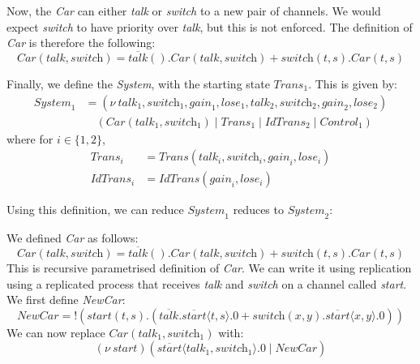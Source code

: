\documentclass[a4paper, openany]{memoir}
\theoremstyle{definition}
\begin{document}
    Now, the \textit{Car} can either \textit{talk} or \textit{switch} to a new pair of channels. We would expect \textit{switch} to have priority over \textit{talk}, but this is not enforced. The definition of \textit{Car} is therefore the following:
    \[\textit{Car}(\textit{talk}, \textit{switch}) = \overline{\textit{talk}}().\textit{Car} (\textit{talk}, \textit{switch}) + \textit{switch} (t, s).\textit{Car}(t, s)\]

    Finally, we define the \textit{System}, with the starting state $\textit{Trans}_1$. This is given by:
    \begin{align*}
        \textit{System}_1 &= (\nu \ \textit{talk}_1, \textit{switch}_1, \textit{gain}_1, \textit{lose}_1, \textit{talk}_2, \textit{switch}_2, \textit{gain}_2, \textit{lose}_2) \\
        &\quad (\textit{Car}(\textit{talk}_1, \textit{switch}_1) \mid \textit{Trans}_1 \mid \textit{IdTrans}_2 \mid \textit{Control}_1)
    \end{align*}
    where for $i \in \{1, 2\}$,
    \begin{align*}
        \textit{Trans}_i &= \textit{Trans}(\textit{talk}_i, \textit{switch}_i, \textit{gain}_i, \textit{lose}_i) \\
        \textit{IdTrans}_i &= \textit{IdTrans}(\textit{gain}_i, \textit{lose}_i) 
    \end{align*}

    Using this definition, we can reduce $\textit{System}_1$ reduces to $\textit{System}_2$:


    We defined \textit{Car} as follows:
    \[\textit{Car}(\textit{talk}, \textit{switch}) = \overline{\textit{talk}}().\textit{Car} (\textit{talk}, \textit{switch}) + \textit{switch} (t, s).\textit{Car}(t, s)\]
    This is recursive parametrised definition of \textit{Car}. We can write it using replication using a replicated process that receives \textit{talk} and \textit{switch} on a channel called \textit{start}. We first define \textit{NewCar}:
    \[\textit{NewCar} = !(\textit{start}(t, s).(
        \overline{\textit{talk}}.\overline{\textit{start}}\langle t, s \rangle.0 + 
        \textit{switch}(x, y).\overline{start} \langle x, y \rangle.0
    ))\]
    We can now replace $\textit{Car}(\textit{talk}_1, \textit{switch}_1)$ with:
    \[(\nu \ \textit{start})(\overline{\textit{start}} \langle \textit{talk}_1, \textit{switch}_1 \rangle.0 \mid \textit{NewCar})\]
\end{document}
